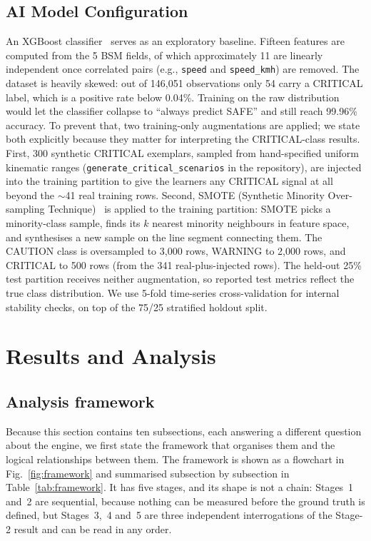 \documentclass[sn-mathphys-num,Numbered,iicol]{sn-jnl}
\begin{document}
\subsection{AI Model Configuration}\label{sec:ai_config}
An XGBoost classifier~\cite{chen2016xgboost} serves as an exploratory baseline. Fifteen features are computed from the 5 BSM fields, of which approximately 11 are linearly independent once correlated pairs (e.g., \texttt{speed} and \texttt{speed\_kmh}) are removed. The dataset is heavily skewed: out of 146,051 observations only 54 carry a CRITICAL label, which is a positive rate below 0.04\%. Training on the raw distribution would let the classifier collapse to ``always predict SAFE'' and still reach 99.96\% accuracy. To prevent that, two training-only augmentations are applied; we state both explicitly because they matter for interpreting the CRITICAL-class results. First, 300 synthetic CRITICAL exemplars, sampled from hand-specified uniform kinematic ranges (\texttt{generate\_critical\_scenarios} in the repository), are injected into the training partition to give the learners any CRITICAL signal at all beyond the $\sim$41 real training rows. Second, SMOTE (Synthetic Minority Over-sampling Technique)~\cite{smote2002} is applied to the training partition: SMOTE picks a minority-class sample, finds its $k$ nearest minority neighbours in feature space, and synthesises a new sample on the line segment connecting them. The CAUTION class is oversampled to 3{,}000 rows, WARNING to 2{,}000 rows, and CRITICAL to 500 rows (from the 341 real-plus-injected rows). The held-out 25\% test partition receives neither augmentation, so reported test metrics reflect the true class distribution. We use 5-fold time-series cross-validation for internal stability checks, on top of the 75/25 stratified holdout split.

\section{Results and Analysis}\label{sec:results}

\subsection*{Analysis framework}
Because this section contains ten subsections, each answering a different question about the engine, we first state the framework that organises them and the logical relationships between them. The framework is shown as a flowchart in Fig.~\ref{fig:framework} and summarised subsection by subsection in Table~\ref{tab:framework}. It has five stages, and its shape is not a chain: Stages~1 and~2 are sequential, because nothing can be measured before the ground truth is defined, but Stages~3,~4 and~5 are three independent interrogations of the Stage-2 result and can be read in any order.
\end{document}
